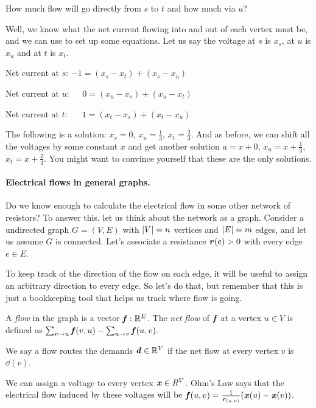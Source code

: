 How much flow will go directly from $s$ to $t$ and how much via $u$?

Well, we know what the net current flowing into and out of each vertex
must be, and we can use to set up some equations.
Let us say the voltage at $s$ is $x_s$, at $u$ is $x_u$ and at $t$ is $x_t$.
\begin{tight_itemize}
\item Net current at $s$:   $-1 = (x_s-x_t) + (x_s-x_u)$
\item  Net current at $u$:   $\phantom{-}0 = (x_u-x_s) + (x_u-x_t)$
\item Net current at  $t$:\,   $\phantom{-}1 = (x_t-x_s)+(x_t-x_u)$
\end{tight_itemize}
The following is a solution: $x_s = 0$, $x_u = \frac{1}{3}$, $x_t
= \frac{2}{3}$.
And as before, we can shift all the voltages by some constant $x$ and
get another solution $a = x+0$, $x_u = x+\frac{1}{3}$, $x_t
= x+\frac{2}{3}$. You might want to convince yourself that these are the only solutions.

\paragraph{Electrical flows in general graphs.}
Do we know enough to calculate the electrical flow in some other
network of resistors?
To answer this, let us think about the network
as a graph.
Consider a undirected graph $G = (V,E)$ with $\left|V \right| = n$ vertices and
$\left|E \right| = m$ edges, and let us assume $G$ is connected.
Let's associate a resistance
$\boldsymbol{\mathit{r}}(e) > 0$ with every edge $e \in E$.

To keep track of the direction of the flow on each edge, it will be
useful to assign an arbitrary direction to every edge. So let's do
that, but remember that this is just a bookkeeping tool that helps
us track where flow is going.

A \emph{flow} in the graph is a vector $\boldsymbol{\mathit{f}}: \mathbb{R}^E$.
%
The \emph{net flow} of $\boldsymbol{\mathit{f}}$ at a vertex $u \in V$ is defined as
$\sum_{v \to u} \boldsymbol{\mathit{f}}(v,u) - \sum_{u  \to v} \boldsymbol{\mathit{f}}(u,v).$

We say a flow routes the demands $\boldsymbol{\mathit{d}} \in \mathbb{R}^V$ if the net flow at
every vertex $v$ is $\dd(v)$.

We can assign a voltage to every vertex $\boldsymbol{\mathit{x}} \in R^V$.
Ohm's Law says that the electrical flow induced by these voltages will
be $\boldsymbol{\mathit{f}}(u,v) = \frac{1}{\boldsymbol{\mathit{r}}_{(u,v)}} (\boldsymbol{\mathit{x}}(u) - \boldsymbol{\mathit{x}}(v))$.

